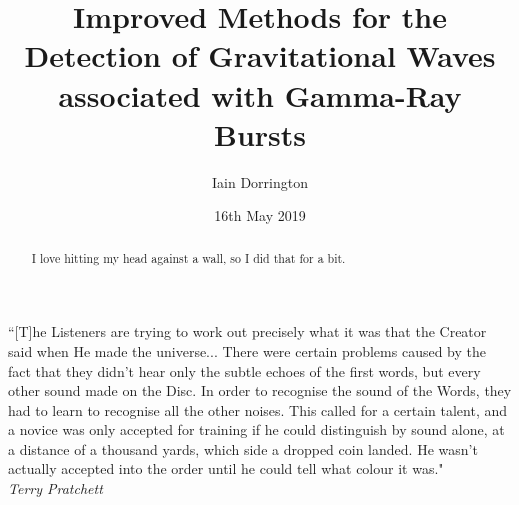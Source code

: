 \documentclass[11pt]{cuthesis}
\title{Improved Methods for the Detection of Gravitational Waves associated with Gamma-Ray Bursts}
\author{Iain Dorrington}
\date{16th May 2019}
\begin{document}

\maketitle

\frontmatter

\begin{abstract}
    I love hitting my head against a wall, so I did that for a bit.
\end{abstract}

\declaration

\tableofcontents
\listoffigures
\listoftables

\begin{dedication}
    ``[T]he Listeners are trying to work out precisely what it was that the Creator said when He made the universe...  There were certain problems caused by the fact that they didn't hear only the subtle echoes of the first words, but every other sound made on the Disc. In order to recognise the sound of the Words, they had to learn to recognise all the other noises. This called for a certain talent, and a novice was only accepted for training if he could distinguish by sound alone, at a distance of a thousand yards, which side a dropped coin landed. He wasn't actually accepted into the order until he could tell what colour it was."\\
    \vspace{1cm}
    \hfill \textit{Terry Pratchett}
\end{dedication}


\mainmatter
\end{document}
